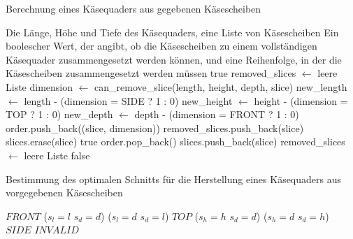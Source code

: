 \documentclass[a4paper,10pt,ngerman]{scrartcl}
\begin{document}
    \begin{algorithm}
        \caption{Berechnung eines Käsequaders aus gegebenen Käsescheiben}
        \label{alg:cheese}
        \begin{algorithmic}
            \Require Die Länge, Höhe und Tiefe des Käsequaders, eine Liste von Käsescheiben
            \Ensure Ein boolescher Wert, der angibt, ob die Käsescheiben zu einem vollständigen Käsequader zusammengesetzt werden können,
            und eine Reihenfolge, in der die Käsescheiben zusammengesetzt werden müssen
                    \State \Return true
                \EndIf
                \State removed\_slices $\gets$ leere Liste
                    \State dimension $\gets$ can\_remove\_slice(length, height, depth, slice)
                        \State new\_length $\gets$ length - (dimension = SIDE ? 1 : 0)
                        \State new\_height $\gets$ height - (dimension = TOP ? 1 : 0)
                        \State new\_depth $\gets$ depth - (dimension = FRONT ? 1 : 0)
                        \State order.push\_back((slice, dimension))
                        \State removed\_slices.push\_back(slice)
                        \State slices.erase(slice)
                            \State \Return true
                        \Else
                            \State order.pop\_back()
                                \State slices.push\_back(slice)
                            \EndFor
                            \State removed\_slices $\gets$ leere Liste
                        \EndIf
                    \EndIf
                \EndFor
                \State \Return false
            \EndFunction
        \end{algorithmic}
    \end{algorithm}

    \begin{algorithm}
        \caption{Bestimmung des optimalen Schnitts für die Herstellung eines Käsequaders aus vorgegebenen Käsescheiben}
        \label{alg:cheese2}
        \begin{algorithmic}
                    \State \Return $FRONT$
                \ElsIf
                        {($s_l = l$ \land $s_d = d$) \lor ($s_l = d$ \land $s_d = l$)}
                    \State \Return $TOP$
                \ElsIf
                        {($s_h = h$ \land $s_d = d$) \lor ($s_h = d$ \land $s_d = h$)}
                    \State \Return $SIDE$
                \Else
                    \State \Return $INVALID$
                \EndIf
            \EndFunction
        \end{algorithmic}
    \end{algorithm}
\end{document}
